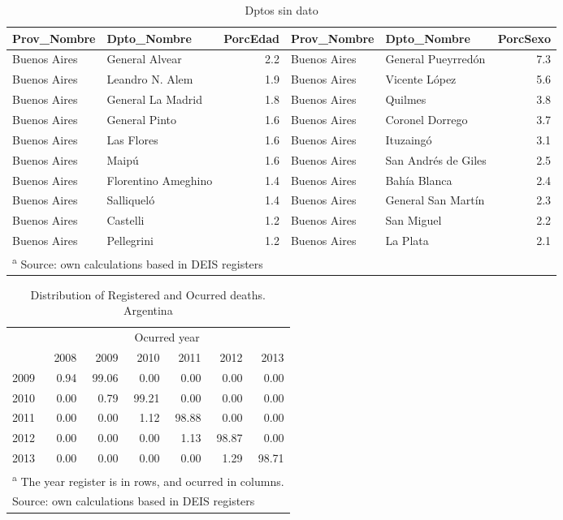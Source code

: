 \documentclass[12pt,]{article}
\begin{document}
\begin{table}

\caption{\label{tab:UnkSexAge}Dptos sin dato}
\centering
\begin{tabular}[t]{l|l|r|l|l|r}
\hline
Prov\_Nombre & Dpto\_Nombre & PorcEdad & Prov\_Nombre & Dpto\_Nombre & PorcSexo\\
\hline
Buenos Aires & General Alvear & 2.2 & Buenos Aires & General Pueyrredón & 7.3\\
\hline
Buenos Aires & Leandro N. Alem & 1.9 & Buenos Aires & Vicente López & 5.6\\
\hline
Buenos Aires & General La Madrid & 1.8 & Buenos Aires & Quilmes & 3.8\\
\hline
Buenos Aires & General Pinto & 1.6 & Buenos Aires & Coronel Dorrego & 3.7\\
\hline
Buenos Aires & Las Flores & 1.6 & Buenos Aires & Ituzaingó & 3.1\\
\hline
Buenos Aires & Maipú & 1.6 & Buenos Aires & San Andrés de Giles & 2.5\\
\hline
Buenos Aires & Florentino Ameghino & 1.4 & Buenos Aires & Bahía Blanca & 2.4\\
\hline
Buenos Aires & Salliqueló & 1.4 & Buenos Aires & General San Martín & 2.3\\
\hline
Buenos Aires & Castelli & 1.2 & Buenos Aires & San Miguel & 2.2\\
\hline
Buenos Aires & Pellegrini & 1.2 & Buenos Aires & La Plata & 2.1\\
\hline
\multicolumn{6}{l}{\textsuperscript{a} Source: own calculations based in DEIS registers}\\
\end{tabular}
\end{table}

\begin{table}

\caption{\label{tab:def_tardias}Distribution of Registered and Ocurred deaths. Argentina}
\centering
\begin{tabular}[t]{l|r|r|r|r|r|r}
\hline
\multicolumn{1}{c|}{ } & \multicolumn{6}{c}{Ocurred year} \\
\cline{2-7}
  & 2008 & 2009 & 2010 & 2011 & 2012 & 2013\\
\hline
2009 & 0.94 & 99.06 & 0.00 & 0.00 & 0.00 & 0.00\\
\hline
2010 & 0.00 & 0.79 & 99.21 & 0.00 & 0.00 & 0.00\\
\hline
2011 & 0.00 & 0.00 & 1.12 & 98.88 & 0.00 & 0.00\\
\hline
2012 & 0.00 & 0.00 & 0.00 & 1.13 & 98.87 & 0.00\\
\hline
2013 & 0.00 & 0.00 & 0.00 & 0.00 & 1.29 & 98.71\\
\hline
\multicolumn{7}{l}{\textsuperscript{a} The year register is in rows, and ocurred in columns.}\\
\multicolumn{7}{l}{Source: own calculations based in DEIS registers}\\
\end{tabular}
\end{table}
\end{document}
